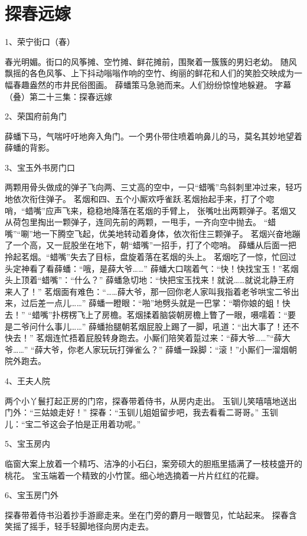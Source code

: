 \section*{探春远嫁}

1、荣宁街口（春）\par
春光明媚。街口的风筝摊、空竹摊、鲜花摊前，围聚着一簇簇的男妇老幼。
随风飘摇的各色风筝、上下抖动嗡嗡作响的空竹、绚丽的鲜花和人们的笑脸交映成为一幅春趣盎然的市井民俗图画。
薛蟠策马急驰而来。人们纷纷惊惶地躲避。
字幕（叠）第二十三集：探春远嫁

2、荣国府前角门\par
薛蟠下马，气喘吁吁地奔入角门。一个男仆带住喷着响鼻儿的马，莫名其妙地望着薛蟠的背影。

3、宝玉外书房门口\par
两颗用骨头做成的弹子飞向两、三丈高的空中，一只“蜡嘴”鸟斜刺里冲过来，轻巧地依次衔住弹子。
茗烟和四、五个小厮欢呼雀跃.茗烟抬起手来，打了个唿哨，“蜡嘴”应声飞来，稳稳地降落在茗烟的手臂上，
张嘴吐出两颗弹子。茗烟又从荷包里掏出一颗弹子，连同先前的两颗，一甩手，一齐向空中抛去。
“蜡嘴”“唰”地一下腾空飞起，优美地转动着身体，依次衔住三颗弹子。
茗烟兴奋地蹦了一个高，又一屁股坐在地下，朝“蜡嘴”一招手，打了个唿哨。
薛蟠从后面一把拎起茗烟。“蜡嘴”失去了目标，盘旋着落在茗烟的头上。
茗烟吃了一惊，忙回过头定神看了看薛蟠：“哦，是薛大爷……”
薛蟠大口喘着气：“快！快找宝玉！”茗烟头上顶着“蜡嘴”：“什么？”
薛蟠急切地：“快把宝玉找来！就说……就说北静王府来人了！”
茗烟面有难色：“……薛大爷，那一回你老人家叫我指着老爷哄宝二爷出来，过后差一点儿……”
薛蟠一瞪眼：“啪”地劈头就是一巴掌：“嚼你娘的蛆！快去！”
“蜡嘴”扑楞楞飞上了房檐。茗烟揉着脑袋朝房檐上瞥了一眼，嗫嚅着：“要是二爷问什么事儿……”
薛蟠抬腿朝茗烟屁股上踢了一脚，吼道：“出大事了！还不快去！”
茗烟连忙捂着屁股转身跑去。小厮们陪笑着踅过来：“薛大爷……”“薛大爷……”
“薛大爷，你老人家玩玩打弹雀么？”
薛蟠一跺脚：“滚！”小厮们一溜烟朝院外跑去。

4、王夫人院\par
两个小丫鬟打起正房的门帘，探春带着侍书，从房内走出。
玉钏儿笑嘻嘻地送出门外：“三姑娘走好！”
探春：“玉钏儿姐姐留步吧，我去看看二哥哥。”
玉钏儿：“宝二爷这会子怕是正用着功呢。”

5、宝玉房内\par
临窗大案上放着一个精巧、洁净的小石臼，案旁硕大的胆瓶里插满了一枝枝盛开的桃花。
宝玉端着一个精致的小竹筐。细心地选摘着一片片红红的花瓣。

6、宝玉房门外\par
探春带着侍书沿着抄手游廊走来。坐在门旁的麝月一眼瞥见，忙站起来。
探春含笑摇了摇手，轻手轻脚地径向房内走去。

